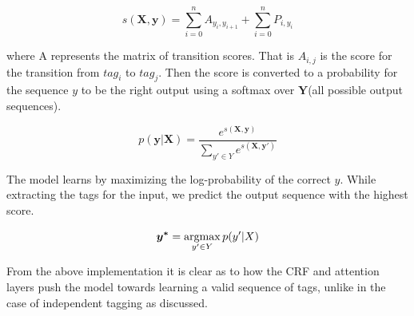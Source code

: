 \begin{equation}
    s(\boldsymbol{X,y}) = \sum_{i=0}^{n} A_{y_i,y_{i+1}} + \sum_{i=0}^{n} P_{i,y_{i}} 
\end{equation}

where A represents the matrix of transition scores. That is $A_{i,j}$ is the score for the transition from $tag_i$ to $tag_j$. Then the score is converted to a probability for the sequence $y$ to be the right output using a softmax over $\boldsymbol{Y}$(all possible output sequences). 

\begin{equation}
    p(\boldsymbol{y|X}) = 
    \dfrac{e^{s(\boldsymbol{X,y})}}{\sum_{y' \in Y} e^{s(\boldsymbol{X,y'})}  }
\end{equation}

The model learns by maximizing the log-probability of the correct $y$. While extracting the tags for the input, we predict the output sequence with the highest score.

\begin{equation}
    \boldsymbol{y^*} = \operatorname*{argmax}_{y' \in Y} p(y'|X)
\end{equation}

From the above implementation it is clear as to how the CRF and attention layers push the model towards learning a valid sequence of tags, unlike in the case of independent tagging as discussed.

